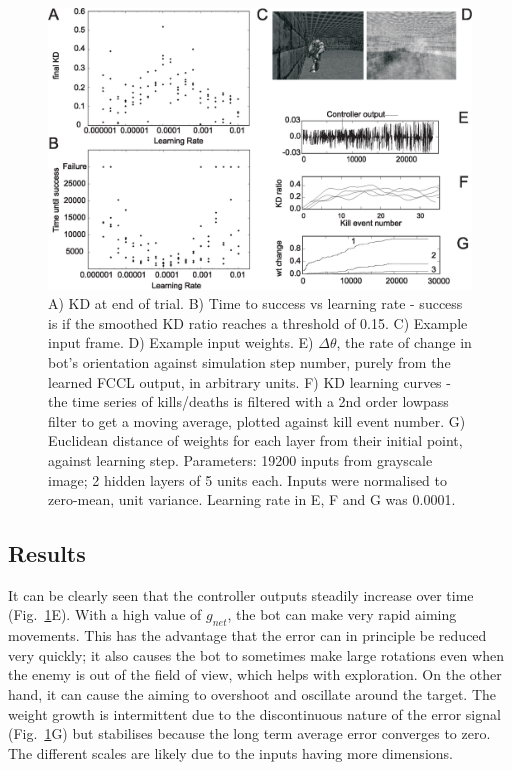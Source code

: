 \documentclass[Afour,sageh,times]{sagej}
\begin{document}
\begin{figure}[!ht]
	\centering \includegraphics[width=\textwidth]{FPSFig7}
	\caption{A) KD at end of trial. B) Time to success vs learning
          rate - success is if the smoothed KD ratio reaches a
          threshold of 0.15. C) Example input frame. D) Example input weights.
          E) $\Delta \theta$, the rate of change in
          bot's orientation against simulation step number, purely
          from the learned FCCL output, in arbitrary units. F) KD learning
          curves - the time series of kills/deaths is filtered with a
          2nd order lowpass filter to get a moving average, plotted
          against kill event number. G) Euclidean distance of weights
          for each layer from their initial point, against learning
          step.
          Parameters: 19200 inputs from grayscale image; 2
          hidden layers of 5 units each. Inputs were
          normalised to zero-mean, unit variance. Learning rate in E, F
          and G was 0.0001.
		\label{shooter_results}}
\end{figure}

\subsection{Results}
It can be clearly seen that the controller outputs steadily increase over
time (Fig.~\ref{shooter_results}E). With a high value of $g_{net}$,
the bot can make very rapid aiming movements. This has the advantage
that the error can in principle be reduced very quickly; it also
causes the bot to sometimes make large rotations even when the enemy
is out of the field of view, which helps with exploration. On the
other hand, it can cause the aiming to overshoot and oscillate around
the target. The weight growth is intermittent due to the discontinuous
nature of the error signal (Fig.~\ref{shooter_results}G) but stabilises
because the long term average error converges to zero. The different
scales are likely due to the inputs having more dimensions.
\end{document}
